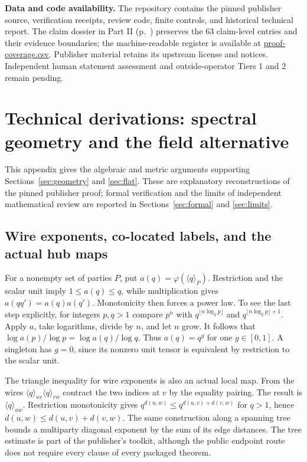 \documentclass[11pt,letterpaper]{article}
\theoremstyle{definition}\newtheorem{definition}[theorem]{Definition}\newtheorem{example}[theorem]{Example}
\theoremstyle{remark}\newtheorem{remark}[theorem]{Remark}
\newcommand{\aud}[2]{\href{https://github.com/nousentllc/VP-VNP-Review/blob/567303d0bcf4f9d54390437b137752446e58ccd6/#1}{#2}}
\begin{document}
\noindent\textbf{Data and code availability.} The repository contains the pinned publisher source, verification receipts, review code, finite controls, and historical technical report. The claim dossier in Part II (p.~\pageref{part:dossier}) preserves the 63 claim-level entries and their evidence boundaries; the machine-readable register is available at \aud{report/proof-coverage.csv}{proof-coverage.csv}. Publisher material retains its upstream license and notices. Independent human statement assessment and outside-operator Tiers 1 and 2 remain pending.

\appendix
\section{Technical derivations: spectral geometry and the field alternative}\label{sec:geometricdetail}
This appendix gives the algebraic and metric arguments supporting Sections~\ref{sec:geometry} and \ref{sec:flat}. These are explanatory reconstructions of the pinned publisher proof; formal verification and the limits of independent mathematical review are reported in Sections~\ref{sec:formal} and \ref{sec:limits}.

\subsection{Wire exponents, co-located labels, and the actual hub maps}
For a nonempty set of parties $P$, put $a(q)=\varphi(\langle q\rangle_P)$. Restriction and the scalar unit imply $1\le a(q)\le q$, while multiplication gives $a(qq')=a(q)a(q')$. Monotonicity then forces a power law. To see the last step explicitly, for integers $p,q>1$ compare $p^n$ with $q^{\lfloor n\log_qp\rfloor}$ and $q^{\lfloor n\log_qp\rfloor+1}$. Apply $a$, take logarithms, divide by $n$, and let $n$ grow. It follows that $\log a(p)/\log p=\log a(q)/\log q$. Thus $a(q)=q^g$ for one $g\in[0,1]$. A singleton has $g=0$, since its nonzero unit tensor is equivalent by restriction to the scalar unit.

The triangle inequality for wire exponents is also an actual local map. From the wires $\langle q\rangle_{uv}\langle q\rangle_{vw}$ contract the two indices at $v$ by the equality pairing. The result is $\langle q\rangle_{uw}$. Restriction monotonicity gives $q^{d(u,w)}\le q^{d(u,v)+d(v,w)}$ for $q>1$, hence $d(u,w)\le d(u,v)+d(v,w)$. The same construction along a spanning tree bounds a multiparty diagonal exponent by the sum of its edge distances. The tree estimate is part of the publisher's toolkit, although the public endpoint route does not require every clause of every packaged theorem.
\end{document}
